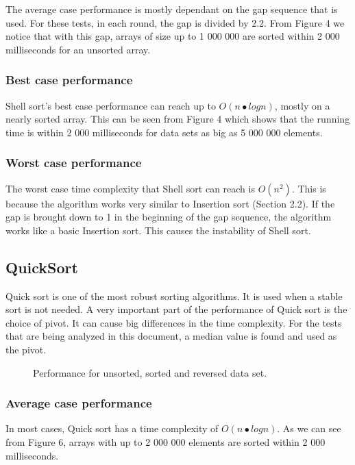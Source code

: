 \documentclass{acm_proc_article-sp}
\begin{document}
The average case performance is mostly dependant on the gap sequence that is used. For these tests, in each round, the gap is divided by 2.2. From Figure 4 we notice that with this gap, arrays of size up to 1 000 000 are sorted within 2 000 milliseconds for an unsorted array.

\subsubsection{Best case performance}

Shell sort's best case performance can reach up to $O(n•logn)$, mostly on a nearly sorted array. This can be seen from Figure 4 which shows that the running time is within 2 000 milliseconds for data sets as big as 5 000 000 elements.

\subsubsection{Worst case performance}

The worst case time complexity that Shell sort can reach is $O(n^{2})$. This is because the algorithm works very similar to Insertion sort (Section 2.2). If the gap is brought down to 1 in the beginning of the gap sequence, the algorithm works like a basic Insertion sort. This causes the instability of Shell sort.

\subsection{QuickSort}

Quick sort is one of the most robust sorting algorithms. It is used when a stable sort is not needed. A very important part of the performance of Quick sort is the choice of pivot. It can cause big differences in the time complexity. For the tests that are being analyzed in this document, a median value is found and used as the pivot.

\begin{figure}[!htb]
\caption{Performance for unsorted, sorted and reversed data set.}
\end{figure}

\subsubsection{Average case performance}

In most cases, Quick sort has a time complexity of $O(n•logn)$. As we can see from Figure 6, arrays with up to 2 000 000 elements are sorted within 2 000 milliseconds.
\end{document}
